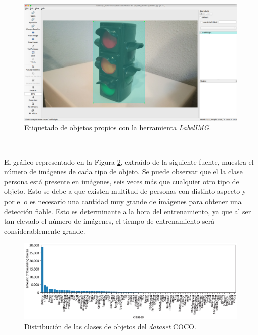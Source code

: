 \begin{figure} [h!]
	\begin{center}
		\includegraphics[width=12cm]{figs/customlabelimg}
	\end{center}
	\caption{Etiquetado de objetos propios con la herramienta \textit{LabelIMG}.}
	\label{fig:customlabelimg}
\end{figure}\

El gráfico representado en la Figura \ref{fig:graphcoco}, extraído de la siguiente fuente\cite{graphcoco}, muestra el número de imágenes de cada tipo de objeto. Se puede observar que el la clase persona está presente en imágenes, seis veces más que cualquier otro tipo de objeto. Esto se debe a que existen multitud de personas con distinto aspecto y por ello es necesario una cantidad muy grande de imágenes para obtener una detección fiable. Esto es determinante a la hora del entrenamiento, ya que al ser tan elevado el número de imágenes, el tiempo de entrenamiento será considerablemente grande.\\

\begin{figure} [h!]
	\begin{center}
		\includegraphics[width=14cm]{figs/graphcoco}
	\end{center}
	\caption{Distribución de las clases de objetos del \textit{dataset} COCO.}
	\label{fig:graphcoco}
\end{figure}\

